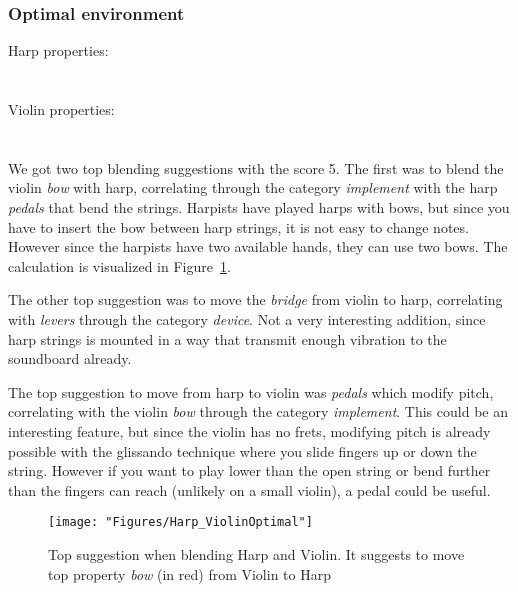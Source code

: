 \subsubsection{Optimal environment}
Harp properties:\\
\noindent{}
\\\\Violin properties:\\
\noindent{}
\\\\We got two top blending suggestions with the score 5. The first was to blend the violin \emph{bow} with harp, correlating through the category \emph{implement} with the harp \emph{pedals} that bend the strings. Harpists have played harps with bows, but since you have to insert the bow between harp strings, it is not easy to change notes. However since the harpists have two available hands, they can use two bows. The calculation is visualized in Figure~\ref{fig:Harp-ViolinOptimal}.

The other top suggestion was to move the \emph{bridge} from violin to harp, correlating with \emph{levers} through the category \emph{device}. Not a very interesting addition, since harp strings is mounted in a way that transmit enough vibration to the soundboard already.

The top suggestion to move from harp to violin was \emph{pedals} which modify pitch, correlating with the violin \emph{bow} through the category \emph{implement}. This could be an interesting feature, but since the violin has no frets, modifying pitch is already possible with the glissando technique where you slide fingers up or down the string. However if you want to play lower than the open string or bend further than the fingers can reach (unlikely on a small violin), a pedal could be useful.
		
\begin{figure} \centering \texttt{[image: "Figures/Harp\_ViolinOptimal"]} \caption{Top suggestion when blending Harp and Violin. It suggests to move top property \emph{bow} (in red) from Violin to Harp } \label{fig:Harp-ViolinOptimal} \end{figure}


